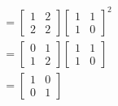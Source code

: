 \documentclass[12pt, letterpaper]{article}
\begin{document}
\begin{enumerate}
\begin{itemize}
\begin{align*}
		&= \begin{bmatrix}1 & 2\\ 2 & 2\end{bmatrix} \begin{bmatrix}1 & 1\\ 1 & 0\end{bmatrix}^2\\
		&= \begin{bmatrix}0 & 1\\ 1 & 2\end{bmatrix} \begin{bmatrix}1 & 1\\ 1 & 0\end{bmatrix}\\
		&= \begin{bmatrix}1 & 0 \\ 0 & 1\end{bmatrix}
		\end{align*}
	\end{itemize}
\end{enumerate}
\end{document}
